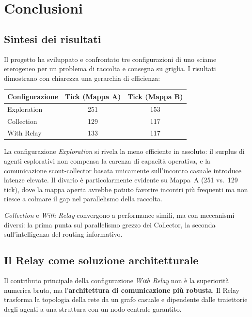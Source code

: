 \section{Conclusioni}
\label{sec:conclusioni}

\subsection{Sintesi dei risultati}

Il progetto ha sviluppato e confrontato tre configurazioni di uno sciame eterogeneo per un problema di raccolta e consegna su griglia. I risultati dimostrano con chiarezza una gerarchia di efficienza:

\begin{center}
\begin{tabular}{lcc}
\toprule
\textbf{Configurazione} & \textbf{Tick (Mappa A)} & \textbf{Tick (Mappa B)} \\
\midrule
Exploration & 251 & 153 \\
Collection  & 129 & 117 \\
With Relay  & 133 & 117 \\
\bottomrule
\end{tabular}
\end{center}

La configurazione \emph{Exploration} si rivela la meno efficiente in assoluto: il surplus di agenti esplorativi non compensa la carenza di capacità operativa, e la comunicazione scout-collector basata unicamente sull'incontro casuale introduce latenze elevate. Il divario è particolarmente evidente su Mappa~A (251 vs.\ 129 tick), dove la mappa aperta avrebbe potuto favorire incontri più frequenti ma non riesce a colmare il gap nel parallelismo della raccolta.

\emph{Collection} e \emph{With Relay} convergono a performance simili, ma con meccanismi diversi: la prima punta sul parallelismo grezzo dei Collector, la seconda sull'intelligenza del routing informativo.

\subsection{Il Relay come soluzione architetturale}

Il contributo principale della configurazione \emph{With Relay} non è la superiorità numerica bruta, ma l'\textbf{architettura di comunicazione più robusta}. Il Relay trasforma la topologia della rete da un grafo casuale e dipendente dalle traiettorie degli agenti a una struttura con un nodo centrale garantito.


